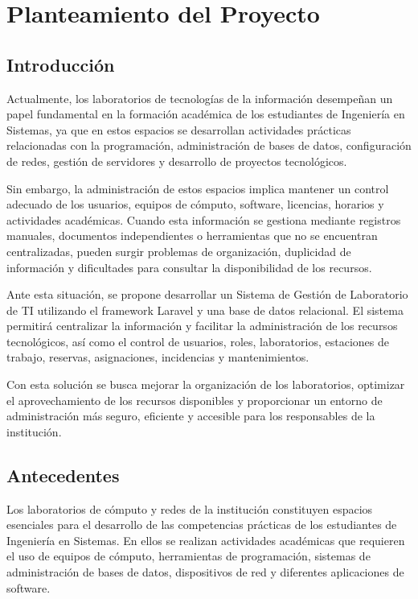 
\chapter{Planteamiento del Proyecto}

\section{Introducción}

Actualmente, los laboratorios de tecnologías de la información desempeñan un papel fundamental en la formación académica de los estudiantes de Ingeniería en Sistemas, ya que en estos espacios se desarrollan actividades prácticas relacionadas con la programación, administración de bases de datos, configuración de redes, gestión de servidores y desarrollo de proyectos tecnológicos.

Sin embargo, la administración de estos espacios implica mantener un control adecuado de los usuarios, equipos de cómputo, software, licencias, horarios y actividades académicas. Cuando esta información se gestiona mediante registros manuales, documentos independientes o herramientas que no se encuentran centralizadas, pueden surgir problemas de organización, duplicidad de información y dificultades para consultar la disponibilidad de los recursos.

Ante esta situación, se propone desarrollar un Sistema de Gestión de Laboratorio de TI utilizando el framework Laravel y una base de datos relacional. El sistema permitirá centralizar la información y facilitar la administración de los recursos tecnológicos, así como el control de usuarios, roles, laboratorios, estaciones de trabajo, reservas, asignaciones, incidencias y mantenimientos.

Con esta solución se busca mejorar la organización de los laboratorios, optimizar el aprovechamiento de los recursos disponibles y proporcionar un entorno de administración más seguro, eficiente y accesible para los responsables de la institución.

\section{Antecedentes}

Los laboratorios de cómputo y redes de la institución constituyen espacios esenciales para el desarrollo de las competencias prácticas de los estudiantes de Ingeniería en Sistemas. En ellos se realizan actividades académicas que requieren el uso de equipos de cómputo, herramientas de programación, sistemas de administración de bases de datos, dispositivos de red y diferentes aplicaciones de software.

